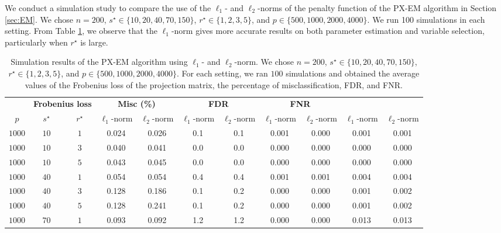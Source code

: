 \documentclass[pdftex, noinfoline, letter]{imsart}
\theoremstyle{plain}
\begin{document}
We conduct a simulation study to compare the use of the $\ell_1$- and $\ell_2$-norms of the penalty function of the PX-EM algorithm in Section \ref{sec:EM}. 
We chose $n = 200$, $s^\star \in \{10, 20, 40, 70, 150\}$, $r^\star \in \{1, 2, 3, 5\}$, and $p \in \{500, 1000, 2000, 4000\}$. We run 100 simulations in each setting.
From Table \ref{sim-5}, we observe that the $\ell_1$-norm gives more accurate results on both parameter estimation and variable selection, particularly when $r^\star$ is large. 

\begin{table}[!]
\begin{adjustwidth}{-.5in}{-.5in}  
\centering
\caption{\small Simulation results of the PX-EM algorithm using $\ell_1$- and $\ell_2$-norm. We chose $n = 200$, $s^\star \in \{10, 20, 40, 70, 150\}$, $r^\star \in \{1, 2, 3, 5\}$, and $p \in \{500, 1000, 2000, 4000\}$. For each setting, we ran $100$ simulations and obtained the average values of the Frobenius loss of the projection matrix, the percentage of misclassification, FDR, and FNR.}
\label{sim-5}
{ 
\small
\begin{tabular}{ccc|cc|cc|cc|cc}
\Xhline{2\arrayrulewidth}
\multicolumn{3}{c|}{} & \multicolumn{2}{c|}{\bf Frobenius loss} & \multicolumn{2}{c|}{\bf Misc (\%)}
& \multicolumn{2}{c|}{\bf FDR} & \multicolumn{2}{c}{\bf FNR}
\\\Xhline{2\arrayrulewidth}
    $p$ & $s^\star$ & $r^\star$ &  $\ell_1$-norm & $\ell_2$-norm
    &  $\ell_1$-norm & $\ell_2$-norm &  $\ell_1$-norm & $\ell_2$-norm &  $\ell_1$-norm & $\ell_2$-norm\\
\hline
    $1000$ & $10$ & $1$  &
    0.024 & 0.026 &
    0.1 &  0.1 &
    0.001 & 0.000 & 0.001 & 0.001\\
    $1000$ & $10$ & $3$ &
    0.040 & 0.041  &
    0.0 &  0.0 &
    0.000 & 0.000 & 0.000 & 0.000\\
    $1000$ & $10$ & $5$ &
    0.043 & 0.045 &
    0.0 & 0.0 
    & 0.000 & 0.000 & 0.000 & 0.000\\ 
    \hline
    $1000$ & $40$ & $1$  &
    0.054  & 0.054  &
    0.4 & 0.4  &
    0.001 & 0.001 & 0.004 & 0.004\\
    $1000$ & $40$ & $3$ &
    0.128 & 0.186 &
    0.1 &  0.2
    & 0.000 & 0.000 & 0.001 & 0.002\\
    $1000$ & $40$ & $5$ &
    0.128 & 0.241 &
    0.1 &  0.2 & 
    0.000 & 0.000 & 0.001 & 0.002\\
    \hline
    $1000$ & $70$ & $1$  &
    0.093 & 0.092  &
    1.2 & 1.2 &
    0.000 & 0.000 & 0.013 & 0.013\\

\end{tabular}}
\end{adjustwidth}
\end{table}
\end{document}
